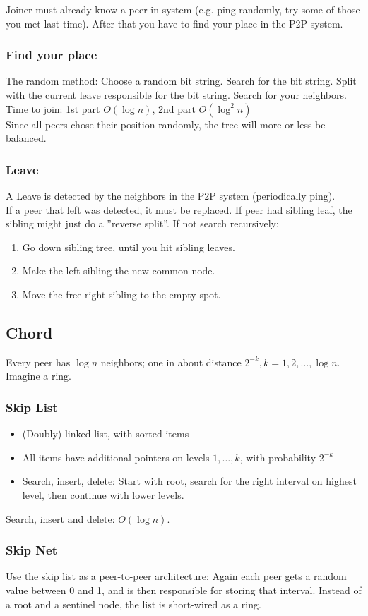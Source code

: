 \documentclass[10pt, a4paper, twocolumn]{scrartcl}
\begin{document}
Joiner must already know a peer in system (e.g. ping randomly, try some of those you met last time). After that you have to find your place in the P2P system.

\subsubsection{Find your place}

The random method: Choose a random bit string. Search for the bit string. Split with the current leave responsible for the bit string. Search for your neighbors.\\

Time to join: 1st part $O(\log n)$, 2nd part $O(\log^2 n)$\\

Since all peers chose their position randomly, the tree will more or less be balanced.

\subsubsection{Leave}

A Leave is detected by the neighbors in the P2P system (periodically ping).\\

If a peer that left was detected, it must be replaced. If peer had sibling leaf, the sibling might just do a ''reverse split''. If not search recursively:
\begin{enumerate}
	\item Go down sibling tree, until you hit sibling leaves.
	\item Make the left sibling the new common node.
	\item Move the free right sibling to the empty spot.
\end{enumerate}

\subsection{Chord}

Every peer has $\log n$ neighbors; one in about distance $2^{-k}, k= 1,2,\ldots,\log n$. Imagine a ring.

\subsubsection{Skip List}

\begin{itemize}
	\item (Doubly) linked list, with sorted items
	\item All items have additional pointers on levels $1,\ldots,k$, with probability $2^{-k}$
	\item Search, insert, delete: Start with root, search for the right interval on highest level, then continue with lower levels.
\end{itemize}

Search, insert and delete: $O(\log n)$.

\subsubsection{Skip Net}

Use the skip list as a peer-to-peer architecture: Again each peer gets a random value between 0 and 1, and is then responsible for storing that interval. Instead of a root and a sentinel node, the list is short-wired as a ring.
\end{document}
